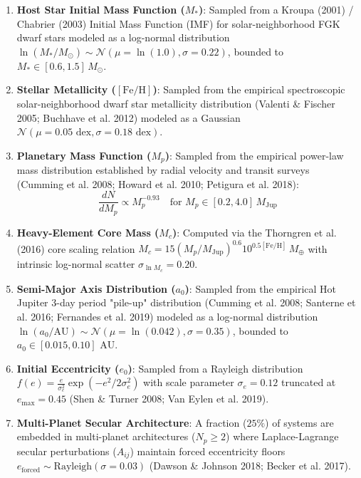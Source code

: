 \begin{enumerate}
    \item \textbf{Host Star Initial Mass Function ($M_*$)}:
    Sampled from a Kroupa (2001) / Chabrier (2003) Initial Mass Function (IMF) for solar-neighborhood FGK dwarf stars modeled as a log-normal distribution $\ln(M_*/M_\odot) \sim \mathcal{N}(\mu = \ln(1.0), \sigma = 0.22)$, bounded to $M_* \in [0.6, 1.5]\,M_\odot$.
    
    \item \textbf{Stellar Metallicity ($[\mathrm{Fe/H}]$)}:
    Sampled from the empirical spectroscopic solar-neighborhood dwarf star metallicity distribution (Valenti \& Fischer 2005; Buchhave et al. 2012) modeled as a Gaussian $\mathcal{N}(\mu = 0.05\text{ dex}, \sigma = 0.18\text{ dex})$.

    \item \textbf{Planetary Mass Function ($M_p$)}:
    Sampled from the empirical power-law mass distribution established by radial velocity and transit surveys (Cumming et al. 2008; Howard et al. 2010; Petigura et al. 2018):
    \begin{equation}
        \frac{dN}{dM_p} \propto M_p^{-0.93} \quad \text{for } M_p \in [0.2, 4.0]\,M_{\mathrm{Jup}}
    \end{equation}

    \item \textbf{Heavy-Element Core Mass ($M_c$)}:
    Computed via the Thorngren et al. (2016) core scaling relation $M_c = 15 (M_p/M_{\mathrm{Jup}})^{0.6} 10^{0.5[\mathrm{Fe/H}]}\,M_\oplus$ with intrinsic log-normal scatter $\sigma_{\ln M_c} = 0.20$.

    \item \textbf{Semi-Major Axis Distribution ($a_0$)}:
    Sampled from the empirical Hot Jupiter 3-day period "pile-up" distribution (Cumming et al. 2008; Santerne et al. 2016; Fernandes et al. 2019) modeled as a log-normal distribution $\ln(a_0/\text{AU}) \sim \mathcal{N}(\mu = \ln(0.042), \sigma = 0.35)$, bounded to $a_0 \in [0.015, 0.10]\text{ AU}$.

    \item \textbf{Initial Eccentricity ($e_0$)}:
    Sampled from a Rayleigh distribution $f(e) = \frac{e}{\sigma_e^2} \exp(-e^2 / 2\sigma_e^2)$ with scale parameter $\sigma_e = 0.12$ truncated at $e_{\max} = 0.45$ (Shen \& Turner 2008; Van Eylen et al. 2019).

    \item \textbf{Multi-Planet Secular Architecture}:
    A fraction ($25\%$) of systems are embedded in multi-planet architectures ($N_p \ge 2$) where Laplace-Lagrange secular perturbations ($A_{ij}$) maintain forced eccentricity floors $e_{\mathrm{forced}} \sim \text{Rayleigh}(\sigma = 0.03)$ (Dawson \& Johnson 2018; Becker et al. 2017).
\end{enumerate}

